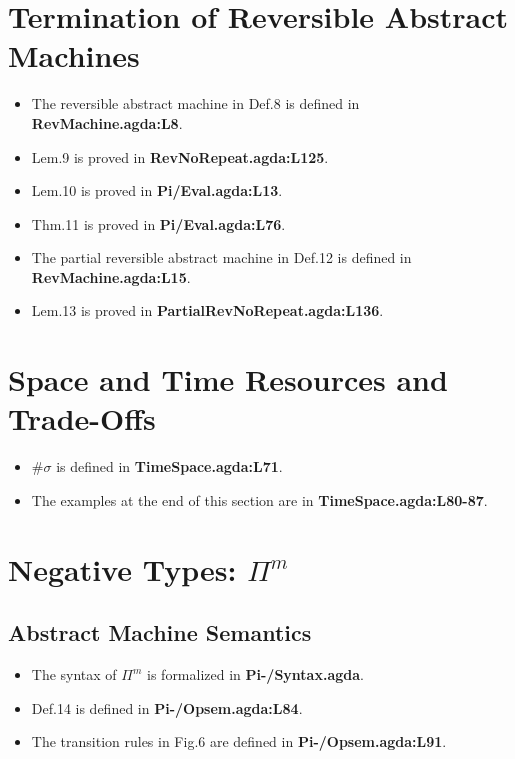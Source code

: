 \documentclass{article}
\begin{document}
\section{Termination of Reversible Abstract Machines}
\begin{itemize}
\item The reversible abstract machine in Def.8 is defined in \textbf{RevMachine.agda:L8}.
\item Lem.9 is proved in \textbf{RevNoRepeat.agda:L125}.
\item Lem.10 is proved in \textbf{Pi/Eval.agda:L13}.
\item Thm.11 is proved in \textbf{Pi/Eval.agda:L76}.
\item The partial reversible abstract machine in Def.12 is defined in \textbf{RevMachine.agda:L15}.
\item Lem.13 is proved in \textbf{PartialRevNoRepeat.agda:L136}.
\end{itemize}

\section{Space and Time Resources and Trade-Offs}
\begin{itemize}
\item $\# \sigma$ is defined in \textbf{TimeSpace.agda:L71}.
\item The examples at the end of this section are in \textbf{TimeSpace.agda:L80-87}.
\end{itemize}

\section{Negative Types: $\Pi^m$}
\subsection{Abstract Machine Semantics}
\begin{itemize}
\item The syntax of $\Pi^m$ is formalized in \textbf{Pi-/Syntax.agda}.
\item Def.14 is defined in \textbf{Pi-/Opsem.agda:L84}.
\item The transition rules in Fig.6 are defined in \textbf{Pi-/Opsem.agda:L91}.
\end{itemize}
\end{document}
